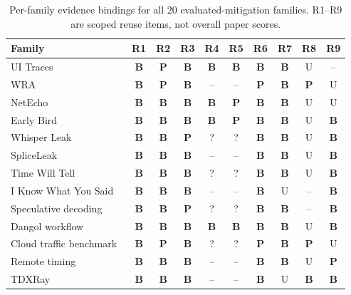 \begin{table}[t]\centering\footnotesize
\caption{Per-family evidence bindings for all 20 evaluated-mitigation families. R1--R9 are scoped reuse items, not overall paper scores.}\label{tab:family-audit}
\setlength{\tabcolsep}{2.2pt}
\begin{tabularx}{\columnwidth}{@{}Y*{9}{c}@{}}\toprule
Family & R1 & R2 & R3 & R4 & R5 & R6 & R7 & R8 & R9\\\midrule
UI Traces~\cite{uitraces2026} & \textbf{B} & \textbf{P} & \textbf{B} & \textbf{B} & \textbf{B} & \textbf{B} & \textbf{B} & U & --\\
WRA~\cite{jeong2026wra} & \textbf{B} & \textbf{P} & \textbf{B} & -- & -- & \textbf{P} & \textbf{B} & \textbf{P} & U\\
NetEcho~\cite{netecho2025} & \textbf{B} & \textbf{B} & \textbf{B} & \textbf{B} & \textbf{P} & \textbf{B} & \textbf{B} & U & U\\
Early Bird~\cite{earlybird2025} & \textbf{B} & \textbf{B} & \textbf{B} & \textbf{B} & \textbf{P} & \textbf{B} & \textbf{B} & U & \textbf{B}\\
Whisper Leak~\cite{whisperleak2025} & \textbf{B} & \textbf{B} & \textbf{P} & ? & ? & \textbf{B} & \textbf{B} & U & \textbf{B}\\
SpliceLeak~\cite{spliceleak2026} & \textbf{B} & \textbf{B} & \textbf{B} & -- & -- & \textbf{B} & \textbf{B} & U & \textbf{B}\\
Time Will Tell~\cite{timewilltell2024} & \textbf{B} & \textbf{B} & \textbf{B} & ? & ? & \textbf{B} & \textbf{B} & U & \textbf{B}\\
I Know What You Said~\cite{gao2025iknow} & \textbf{B} & \textbf{B} & \textbf{B} & -- & -- & \textbf{B} & U & -- & \textbf{B}\\
Speculative decoding~\cite{wei2024speculation} & \textbf{B} & \textbf{B} & \textbf{P} & ? & ? & \textbf{B} & \textbf{B} & -- & \textbf{B}\\
Dangol workflow~\cite{dangol2026workflow} & \textbf{B} & \textbf{B} & \textbf{B} & \textbf{B} & \textbf{B} & \textbf{B} & \textbf{B} & U & \textbf{B}\\
Cloud traffic benchmark~\cite{pouryousef2026traffic} & \textbf{B} & \textbf{P} & \textbf{B} & ? & ? & \textbf{P} & \textbf{B} & \textbf{P} & U\\
Remote timing~\cite{carlini2024remote} & \textbf{B} & \textbf{B} & \textbf{B} & -- & -- & \textbf{B} & \textbf{B} & U & \textbf{P}\\
TDXRay~\cite{hornetz2026tdxray} & \textbf{B} & \textbf{B} & \textbf{B} & -- & -- & \textbf{B} & U & \textbf{B} & \textbf{B}\\

\end{tabularx}
\end{table}
